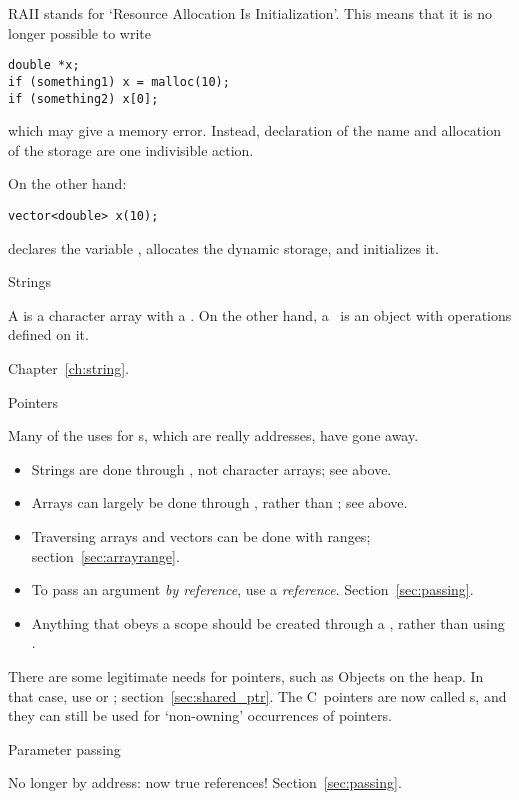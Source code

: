 RAII stands for `Resource Allocation Is Initialization'. This means
that it is no longer possible to write
\begin{verbatim}
double *x;
if (something1) x = malloc(10);
if (something2) x[0];
\end{verbatim}
which may give a memory error.
Instead, declaration of the
name and allocation of the storage are one indivisible action.

On the other hand:
\begin{lstlisting}
vector<double> x(10);
\end{lstlisting}
declares the variable , allocates the dynamic storage, and
initializes it.

 {Strings}

A  is a character array with a . On the other hand, a~ is an object
with operations defined on it.

Chapter~\ref{ch:string}.

 {Pointers}

Many of the uses for s, which are
really addresses, have gone away.
\begin{itemize}
\item Strings are done through , not character arrays;
  see above.
\item Arrays can largely be done through , rather than
  ; see above.
\item Traversing arrays and vectors can be done with ranges;
  section~\ref{sec:arrayrange}.
\item To pass an argument
  \emph{by reference},
  use a \emph{reference}.
  Section~\ref{sec:passing}.
\item Anything that obeys a scope should be created through a
  , rather than using .
\end{itemize}

There are some legitimate needs for pointers, such as Objects on the
heap. In that case, use  or ;
section~\ref{sec:shared_ptr}.
The C~pointers are now called s, and they
can still be used for `non-owning' occurrences of pointers.

 {Parameter passing}

No longer by address: now true references! Section~\ref{sec:passing}.

